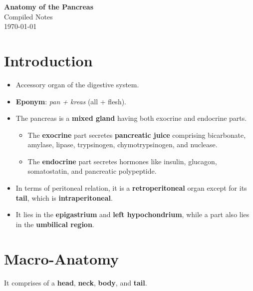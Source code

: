 \documentclass[11pt, a4paper]{article}
\begin{document}
\begin{titlepage}
    \centering
    {\Huge \bfseries Anatomy of the Pancreas}\\[1.5cm]
    {\Large Compiled Notes}\\[2cm]
    \vfill
    {\large \today}
\end{titlepage}

\tableofcontents
\pagebreak

\section{Introduction}
\begin{itemize}
    \item Accessory organ of the digestive system.
    \item \textbf{Eponym}: \textit{pan + kreas} (all + flesh).
    \item The pancreas is a \textbf{mixed gland} having both exocrine and endocrine parts.
    \begin{itemize}
        \item The \textbf{exocrine} part secretes \textbf{pancreatic juice} comprising bicarbonate, amylase, lipase, trypsinogen, chymotrypsinogen, and nuclease.
        \item The \textbf{endocrine} part secretes hormones like insulin, glucagon, somatostatin, and pancreatic polypeptide.
    \end{itemize}
    \item In terms of peritoneal relation, it is a \textbf{retroperitoneal} organ except for its \textbf{tail}, which is \textbf{intraperitoneal}.
    \item It lies in the \textbf{epigastrium} and \textbf{left hypochondrium}, while a part also lies in the \textbf{umbilical region}.
\end{itemize}

\section{Macro-Anatomy}
It comprises of a \textbf{head}, \textbf{neck}, \textbf{body}, and \textbf{tail}.
\end{document}
